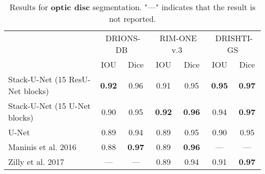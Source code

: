 \documentclass{llncs}
\begin{document}
\begin{table}[ht!]
            \centering
        	\begin{tabular}{l|c|c|c|c|c|c}
        		\hline
        		& \multicolumn{2}{c|}{\,DRIONS-DB\,} &
        		\multicolumn{2}{c|}{\,RIM-ONE v.3\,} &
        		\multicolumn{2}{c}{\,DRISHTI-GS\,} \\
        		& IOU & Dice & IOU & Dice & IOU & Dice \\ \hline \hline
        		Stack-U-Net (15 ResU-Net blocks) & \textbf{0.92} & 0.96 & 0.91 & 0.95 & \textbf{0.95} & \textbf{0.97} \\
                Stack-U-Net (15 U-Net blocks) & 0.90 & 0.95 & \textbf{0.92} & \textbf{0.96} & 0.94 & \textbf{0.97} \\
                \hline
        		U-Net \cite{sevastopolsky2017optic} & 0.89 & 0.94 & 0.89 & 0.95 & 0.90 & 0.95 \\
                
        		Maninis et al. 2016 \cite{driu} & 0.88 & \textbf{0.97} & 0.89 & \textbf{0.96} & --- & --- \\
        		Zilly et al. 2017 \cite{zilly2017glaucoma} & --- & --- & 0.89 & 0.94 & 0.91 & \textbf{0.97} \\ \hline
        	\end{tabular}
            \newline\newline
        	\caption{Results for \textbf{optic disc} segmentation. "---" indicates that the result is not reported.}
            \label{table:optic_disc_results}
\end{table}
\end{document}
